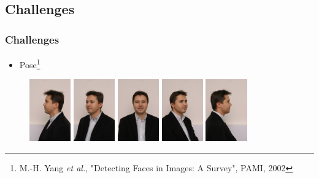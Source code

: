 \documentclass[10pt]{beamer}
\begin{document}
\subsection{Challenges}
\begin{frame}
    \frametitle{Challenges}
   \begin{itemize}
   \item Pose\footnote{M.-H. Yang \textit{et al.}, "Detecting Faces in Images: A Survey", PAMI, 2002}
   \end{itemize}
     \begin{figure}
     \begin{minipage}[t]{0.18\linewidth} 
    \centering 
     \includegraphics[width=0.7in]{d1.jpg} 
   \end{minipage}
   \begin{minipage}[t]{0.18\linewidth} 
     \centering 
     \includegraphics[width=0.7in]{d2.jpg} 
   \end{minipage} 
   \begin{minipage}[t]{0.18\linewidth} 
     \centering 
   \includegraphics[width=0.7in]{d3.jpg} 
   \end{minipage}
   \begin{minipage}[t]{0.18\linewidth} 
     \centering 
     \includegraphics[width=0.7in]{d4.jpg} 
   \end{minipage}
   \begin{minipage}[t]{0.18\linewidth} 
     \centering 
     \includegraphics[width=0.7in]{d5.jpg} 
   \end{minipage}
   \end{figure}
\end{frame}
\end{document}

